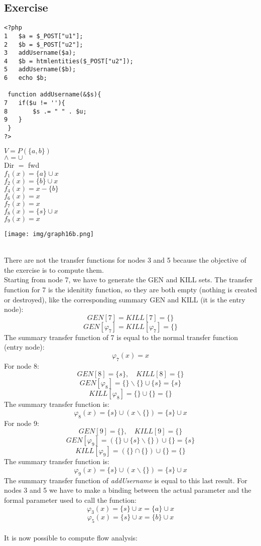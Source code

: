 \documentclass[a4paper, 10pt, titlepage]{article}
\begin{document}
\subsection{Exercise}
\begin{minipage}{0.52\textwidth}
\begin{small}
\begin{lstlisting}
<?php
1	$a = $_POST["u1"];
2	$b = $_POST["u2"];
3 	addUsername($a);
4 	$b = htmlentities($_POST["u2"]);
5	addUsername($b);
6 	echo $b;

 function addUsername(&$s){
7	if($u != ''){
8		$s .= " " . $u;
9	}
 }
?>
\end{lstlisting}
\end{small}
\end{minipage}\vline \hfill
\begin{minipage}{0.2\textwidth}
$ V = P(\{a,b\})$\\
$ \wedge = \cup $\\
Dir $=$ fwd \medskip\\
$f_1(x) = \{a\} \cup x$\\
$f_2(x) = \{b\} \cup x$\\
$f_4(x) = x - \{b\}$\\
$f_6(x) = x$\\
$f_7(x) = x$\\
$f_8(x) = \{s\} \cup x$\\
$f_9(x) = x$
\end{minipage}
\begin{minipage}{0.2\textwidth}
\texttt{[image: img/graph16b.png]}
\end{minipage} \bigskip\\
There are not the transfer functions for nodes 3 and 5 because the objective of the exercise is to compute them. \\Starting from node 7, we have to generate the GEN and KILL sets. The transfer function for 7 is the idenitity function, so they are both empty (nothing is created or destroyed), like the corresponding summary GEN and KILL (it is the entry node):
$$GEN[7] = KILL[7] = \{\}$$
$$GEN[\varphi_7] = KILL[\varphi_7] = \{\}$$
The summary transfer function of 7 is equal to the normal transfer function (entry node):
$$\varphi_7(x) = x$$
For node 8:
$$GEN[8] = \{s\}, \quad KILL[8] = \{\}$$
$$GEN[\varphi_8] = \{\} \backslash \{\} \cup \{s\} = \{s\} $$ 
$$KILL[\varphi_8] = \{\} \cup \{\} = \{\}$$
The summary transfer function is:
$$\varphi_8(x) = \{s\} \cup (x \backslash \{\}) = \{s\} \cup x$$
For node 9:
$$GEN[9] = \{\}, \quad KILL[9] = \{\}$$
$$GEN[\varphi_9] = (\{\} \cup \{s\} \backslash \{\}) \cup \{\} = \{s\} $$ 
$$KILL[\varphi_9] = (\{\} \cap \{\}) \cup \{\} = \{\}$$
The summary transfer function is:
$$\varphi_9(x) = \{s\} \cup (x \backslash \{\}) = \{s\} \cup x$$
The summary transfer function of \textit{addUsername} is equal to this last result. For nodes 3 and 5 we have to make a binding between the actual parameter and the formal parameter used to call the function:
$$\varphi_3(x) = \{s\} \cup x = \{a\} \cup x$$
$$\varphi_5(x) = \{s\} \cup x = \{b\} \cup x$$
\medskip\\It is now possible to compute flow analysis:
\end{document}
